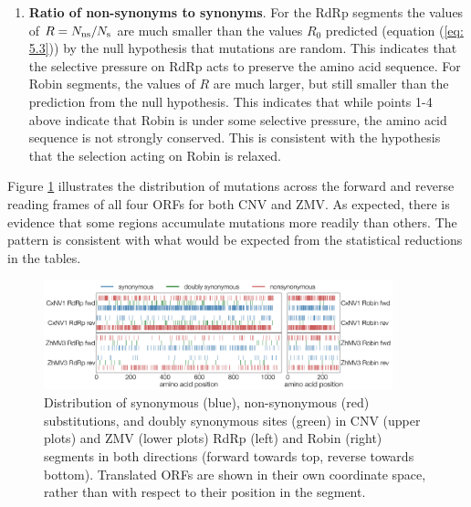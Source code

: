 \documentclass[unnumsec,webpdf,contemporary,large,namedate]{oup-authoring-template}%
\theoremstyle{thmstyleone}%
\theoremstyle{thmstyletwo}%
\theoremstyle{thmstylethree}%
\begin{document}
\begin{enumerate}
\item{\bf Ratio of non-synonyms to synonyms}. For the RdRp segments the values of
$R=N_{\rm ns}/N_{\rm s}$ are much smaller than the values $R_0$
predicted (equation (\ref{eq: 5.3})) by the null hypothesis that mutations are random. This indicates that the selective
pressure on RdRp acts to preserve the amino acid sequence. For Robin segments, the values of $R$
are much larger, but still smaller than the prediction from the null hypothesis. This indicates that while
points 1-4 above indicate that Robin is under some selective pressure, the amino acid sequence
is not strongly conserved.
This is consistent with the hypothesis that the selection acting on Robin is relaxed.

\end{enumerate}

Figure \ref{fig: 2} illustrates the distribution of mutations across the forward and reverse reading frames
of all four ORFs for both CNV and ZMV. As expected, there is evidence that some regions accumulate mutations more readily than others.
The pattern is consistent with what would be expected from the statistical reductions in the tables.

\begin{figure}
\begin{center}
\includegraphics[width=0.9\textwidth]{narna-diversity.png}
\caption{\label{fig: 2}
Distribution of synonymous (blue), non-synonymous (red) substitutions, 
and doubly synonymous sites (green) in CNV (upper plots) and ZMV (lower plots) 
RdRp (left) and Robin (right) segments in both directions (forward towards top, reverse towards bottom).
Translated ORFs are shown in their own coordinate space, rather than with respect to their position in the segment.
}
\end{center}
\end{figure}
\end{document}
